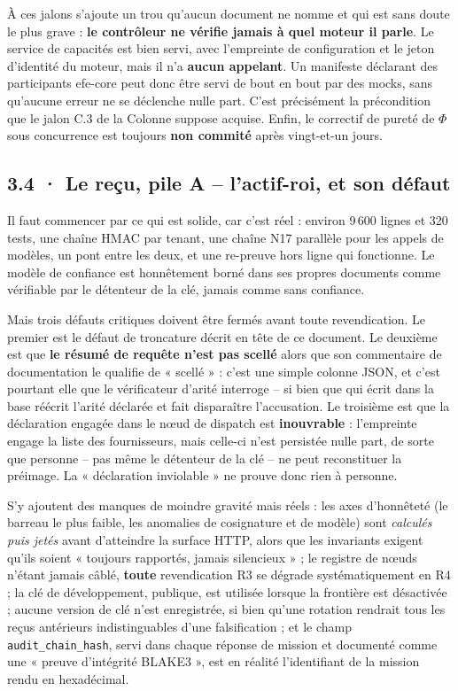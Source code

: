 \documentclass[10pt]{article}
\newcommand{\code}[1]{\texttt{\small #1}}
\begin{document}
À ces jalons s'ajoute un trou qu'aucun document ne nomme et qui est sans doute le plus grave :
\textbf{le contrôleur ne vérifie jamais à quel moteur il parle}. Le service de capacités est bien
servi, avec l'empreinte de configuration et le jeton d'identité du moteur, mais il n'a
\textbf{aucun appelant}. Un manifeste déclarant des participants efe-core peut donc être servi de bout
en bout par des mocks, sans qu'aucune erreur ne se déclenche nulle part. C'est précisément la
précondition que le jalon C.3 de la Colonne suppose acquise. Enfin, le correctif de pureté de $\Phi$
sous concurrence est toujours \textbf{non commité} après vingt-et-un jours.

\subsection{3.4 · Le reçu, pile A -- l'actif-roi, et son défaut}

Il faut commencer par ce qui est solide, car c'est réel : environ 9\,600 lignes et 320 tests, une
chaîne HMAC par tenant, une chaîne N17 parallèle pour les appels de modèles, un pont entre les deux, et
une re-preuve hors ligne qui fonctionne. Le modèle de confiance est honnêtement borné dans ses propres
documents comme vérifiable par le détenteur de la clé, jamais comme sans confiance.

Mais trois défauts critiques doivent être fermés avant toute revendication. Le premier est le défaut de
troncature décrit en tête de ce document. Le deuxième est que \textbf{le résumé de requête n'est pas
scellé} alors que son commentaire de documentation le qualifie de « scellé » : c'est une simple colonne
JSON, et c'est pourtant elle que le vérificateur d'arité interroge -- si bien que qui écrit dans la base
réécrit l'arité déclarée et fait disparaître l'accusation. Le troisième est que la déclaration engagée
dans le n\oe{}ud de dispatch est \textbf{inouvrable} : l'empreinte engage la liste des fournisseurs,
mais celle-ci n'est persistée nulle part, de sorte que personne -- pas même le détenteur de la clé -- ne
peut reconstituer la préimage. La « déclaration inviolable » ne prouve donc rien à personne.

S'y ajoutent des manques de moindre gravité mais réels : les axes d'honnêteté (le barreau le plus
faible, les anomalies de cosignature et de modèle) sont \emph{calculés puis jetés} avant d'atteindre la
surface HTTP, alors que les invariants exigent qu'ils soient « toujours rapportés, jamais silencieux » ;
le registre de n\oe{}uds n'étant jamais câblé, \textbf{toute} revendication R3 se dégrade
systématiquement en R4 ; la clé de développement, publique, est utilisée lorsque la frontière est
désactivée ; aucune version de clé n'est enregistrée, si bien qu'une rotation rendrait tous les reçus
antérieurs indistinguables d'une falsification ; et le champ \code{audit\_chain\_hash}, servi dans
chaque réponse de mission et documenté comme une « preuve d'intégrité BLAKE3 », est en réalité
l'identifiant de la mission rendu en hexadécimal.
\end{document}
